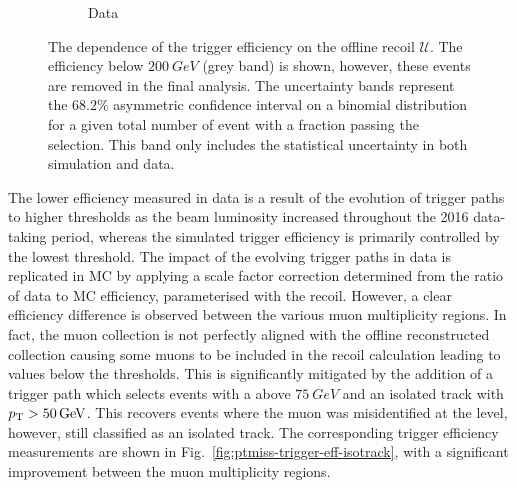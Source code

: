 \begin{figure}[htb]
\begin{subfigure}[b]{0.49\textwidth}
        \caption{Data}
        \label{subfigb:ptmiss-trigger-eff-noisotrack}
    \end{subfigure}
    \caption[Efficiency of the missing energy triggers in data and simulation.]{
        The dependence of the \ptmiss trigger efficiency on the offline recoil $\mathcal{U}$. The efficiency below $\SI{200}{GeV}$ (grey band) is shown, however, these events are removed in the final analysis. The uncertainty bands represent the $68.2\%$ asymmetric confidence interval on a binomial distribution for a given total number of event with a fraction passing the selection. This band only includes the statistical uncertainty in both simulation and data.
    }
    \label{fig:ptmiss-trigger-eff-noisotrack}
\end{figure}

The lower efficiency measured in data is a result of the evolution of trigger paths to higher thresholds as the beam luminosity increased throughout the 2016 data-taking period, whereas the simulated trigger efficiency is primarily controlled by the lowest threshold. The impact of the evolving trigger paths in data is replicated in MC by applying a scale factor correction determined from the ratio of data to MC efficiency, parameterised with the recoil. However, a clear efficiency difference is observed between the various muon multiplicity regions. In fact, the \SWT muon collection is not perfectly aligned with the offline reconstructed collection causing some muons to be included in the \SWT recoil calculation leading to values below the thresholds. This is significantly mitigated by the addition of a \ptmiss trigger path which selects events with a \ptmiss above $\SI{75}{GeV}$ and an isolated track with ${p_{\text{T}}>\SI{50}{GeV}}$. This recovers events where the muon was misidentified at the \SWT level, however, still classified as an isolated track. The corresponding trigger efficiency measurements are shown in Fig.~\ref{fig:ptmiss-trigger-eff-isotrack}, with a significant improvement between the muon multiplicity regions.
%
